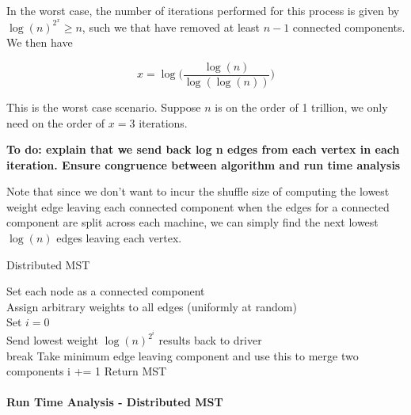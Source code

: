 \documentclass[12pt]{article}
\begin{document}
In the worst case, the number of iterations performed for this process is given by $\log(n)^{2^x} \geq n$, such we that have removed at least $n-1$ connected components. We then have

\[
x = \log \bigg( \frac{\log(n)}{\log(\log(n))}\bigg)
\]

This is the worst case scenario. Suppose $n$ is on the order of 1 trillion, we only need on the order of $x=3$ iterations.

\textbf{To do: explain that we send back log n edges from each vertex in each iteration. Ensure congruence between algorithm and run time analysis}

Note that since we don't want to incur the shuffle size of computing the lowest weight edge leaving each connected component when the edges for a connected component are split across each machine, we can simply find the next lowest $\log(n)$ edges leaving each vertex. 

\LinesNumbered
\begin{algorithm}[H]
\caption{Distributed MST}
Set each node as a connected component \\
Assign arbitrary weights to all edges (uniformly at random) \\
Set $i = 0$ \\
 {
   {
  }
  Send lowest weight $\log(n)^{2^i}$ results back to driver \\
   {
     {
    break
    }
     {
      Take minimum edge leaving component and use this to merge two
      components
    }
  }
  i += 1
}
Return MST
\end{algorithm}

\paragraph{Run Time Analysis - Distributed MST}
\end{document}
